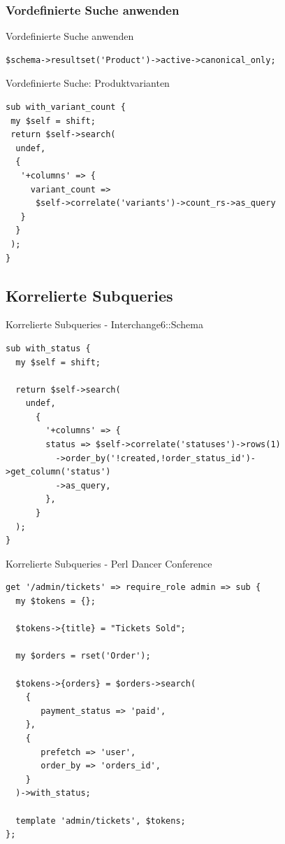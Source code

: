 \subsubsection{Vordefinierte Suche anwenden}

\begin{frame}[fragile]{Vordefinierte Suche anwenden}
\begin{lstlisting}
$schema->resultset('Product')->active->canonical_only;
\end{lstlisting}
\end{frame}

\begin{frame}[fragile]{Vordefinierte Suche: Produktvarianten}
\begin{lstlisting}
sub with_variant_count {
 my $self = shift;
 return $self->search(
  undef,
  {
   '+columns' => {
     variant_count =>
      $self->correlate('variants')->count_rs->as_query
   }
  }
 );
}
\end{lstlisting}
\end{frame}

\subsection{Korrelierte Subqueries}

\begin{frame}[fragile]{Korrelierte Subqueries - Interchange6::Schema}
  \begin{lstlisting} 
sub with_status {
  my $self = shift;

  return $self->search(
    undef,
      {
        '+columns' => {
        status => $self->correlate('statuses')->rows(1)
          ->order_by('!created,!order_status_id')->get_column('status')
          ->as_query,
        },
      }
  );
}
\end{lstlisting}
\end{frame}

\begin{frame}[fragile]{Korrelierte Subqueries - Perl Dancer Conference}
  \begin{lstlisting}
get '/admin/tickets' => require_role admin => sub {
  my $tokens = {};

  $tokens->{title} = "Tickets Sold";

  my $orders = rset('Order');

  $tokens->{orders} = $orders->search(
    {
       payment_status => 'paid',
    },
    {
       prefetch => 'user',
       order_by => 'orders_id',
    }
  )->with_status;

  template 'admin/tickets', $tokens;
};
\end{lstlisting}
\end{frame}

